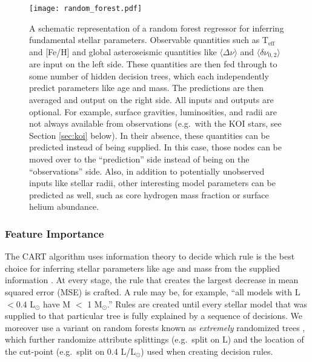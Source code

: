 \documentclass[manuscript,linenumbers]{aastex6}
\newif\ifref
\newcommand{\mb}[1]{\ifref\boldmath\textbf{#1}\unboldmath\else #1\fi}
\begin{document}
\begin{figure*}[ht]
    \centering
    \texttt{[image: random\_forest.pdf]}
    \caption{A schematic representation of a random forest regressor for inferring fundamental stellar parameters. \mb{Observable quantities} such as \mb{T$_{\text{eff}}$ and [Fe/H]} and global asteroseismic quantities like \mb{$\langle\Delta\nu\rangle$ and} $\langle\delta\nu_{0,2}\rangle$ are input on the left side. These quantities are then fed through to some number of hidden decision trees, which each independently predict \mb{parameters} like age and mass. The predictions are then averaged and output on the right side. All inputs and outputs are optional. For example, surface gravities, luminosities, and radii are not always available \mb{from observations} (e.g.\ with the KOI stars\mb{, see Section \ref{sec:koi} below}). In their absence, these quantities can be predicted instead of being supplied. In this case, those nodes can be moved over to the ``prediction'' side instead of being on the ``observations'' side. Also, in addition to potentially unobserved inputs like stellar radii, other interesting model parameters can be predicted as well, such as core hydrogen mass fraction or surface helium abundance. \label{fig:rf} }
\end{figure*}


\subsubsection{Feature Importance} \label{sec:importances}

\mb{The CART algorithm uses} information theory to decide which rule is the best choice for inferring \mb{stellar parameters} like age and mass from the supplied information \citep[][Chapter 9]{hastie2005elements}. At every stage, the rule that creates the largest decrease in mean squared error (MSE) is crafted. A rule may be, for example, ``all models with L $<0.4$ L$_\odot$ have M $<$ 1 M$_\odot$.'' Rules are created until every \mb{stellar model} that was supplied to that particular tree is fully explained by a sequence of decisions. We moreover use a variant on random forests known as \emph{extremely} randomized trees \citep{geurts2006extremely}, which further randomize attribute splittings (e.g.\ split on L) and the location of the cut-point (e.g.\ split on 0.4 L/L$_\odot$) used when creating decision rules. 
\end{document}
